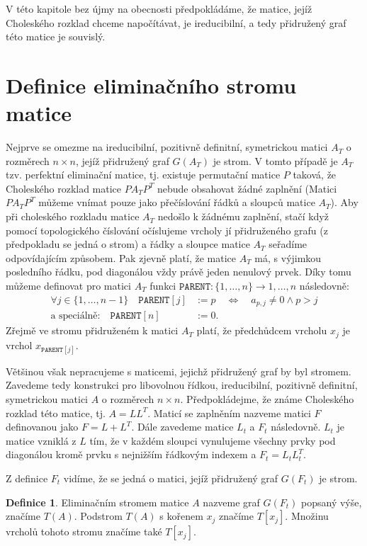 \documentclass[11pt,american,czech,oneside]{book}
\theoremstyle{plain}
\theoremstyle{definition}
\newtheorem{definition}{Definice}
\begin{document}
V této kapitole bez újmy na obecnosti předpokládáme, že matice, jejíž Choleského rozklad chceme napočítávat, je ireducibilní,
a tedy přidružený graf této matice je souvislý.

\section{Definice eliminačního stromu matice}

Nejprve se omezme na ireducibilní, pozitivně definitní, symetrickou matici $A_T$ o rozměrech $n \times n$,
jejíž přidružený graf $G(A_T)$ je strom. V tomto případě je $A_T$ tzv. perfektní eliminační matice, tj. existuje permutační matice $P$ taková,
že Choleského rozklad matice $PA_TP^T$ nebude obsahovat žádné zaplnění \cite{rose:72}
(Matici $PA_TP^T$ můžeme vnímat pouze jako přečíslování řádků a sloupců matice $A_T$).
Aby při choleského rozkladu matice $A_T$ nedošlo k žádnému zaplnění, stačí když pomocí topologického číslování očíslujeme vrcholy jí přidruženého grafu (z předpokladu se jedná o strom)
a řádky a sloupce matice $A_T$ seřadíme odpovídajícím způsobem. Pak zjevně platí, že matice $A_T$ má, s výjimkou posledního řádku,
pod diagonálou vždy právě jeden nenulový prvek.
Díky tomu můžeme definovat pro matici $A_T$ funkci $\texttt{PARENT}: \{1,\ldots,n\} \rightarrow {1,\ldots,n}$ následovně:
\begin{align*}
  \forall j \in \{1,\ldots,n-1\} \quad \texttt{PARENT}[j] & := p \quad \Leftrightarrow \quad a_{p,j} \neq 0 \wedge p > j \\
  \text{a speciálně:} \quad \texttt{PARENT}[n] & := 0.
\end{align*}
Zřejmě ve stromu přidruženém k matici $A_T$ platí, že předchůdcem vrcholu $x_j$ je vrchol $x_{\texttt{PARENT}[j]}$.

Většinou však nepracujeme s maticemi, jejichž přidružený graf by byl stromem. Zavedeme tedy konstrukci pro libovolnou
řídkou, ireducibilní, pozitivně definitní, symetrickou matici $A$ o rozměrech $n \times n$.
Předpokládejme, že známe Choleského rozklad této matice, tj. $A = LL^T$. Maticí se zaplněním nazveme matici $F$ definovanou jako $F = L + L^T$.
Dále zavedeme matice $L_t$ a $F_t$ následovně. $L_t$ je matice vzniklá z $L$ tím, že v každém sloupci vynulujeme všechny prvky pod diagonálou
kromě prvku s nejnižším řádkovým indexem a $F_t = L_t L_t^T$.

Z definice $F_t$ vidíme, že se jedná o matici, jejíž přidružený graf $G(F_t)$ je strom.

\begin{definition}
    Eliminačním stromem matice $A$ nazveme graf $G(F_t)$ popsaný výše, značíme $T(A)$.
    Podstrom $T(A)$ s kořenem $x_j$ značíme $T[x_j]$. Množinu vrcholů tohoto stromu značíme také $T[x_j]$.
\end{definition}
\end{document}
